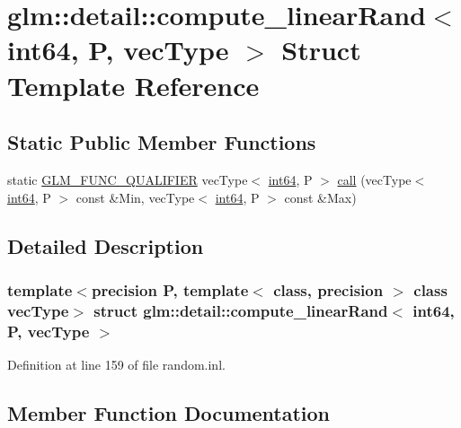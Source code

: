 \hypertarget{structglm_1_1detail_1_1compute__linear_rand_3_01int64_00_01_p_00_01vec_type_01_4}{}\section{glm\+::detail\+::compute\+\_\+linear\+Rand$<$ int64, P, vec\+Type $>$ Struct Template Reference}
\label{structglm_1_1detail_1_1compute__linear_rand_3_01int64_00_01_p_00_01vec_type_01_4}
\subsection*{Static Public Member Functions}
\begin{DoxyCompactItemize}
\item 
static \mbox{\hyperlink{setup_8hpp_a33fdea6f91c5f834105f7415e2a64407}{G\+L\+M\+\_\+\+F\+U\+N\+C\+\_\+\+Q\+U\+A\+L\+I\+F\+I\+ER}} vec\+Type$<$ \mbox{\hyperlink{namespaceglm_1_1detail_a5b1c3227ec636c24a0676746381adfc8}{int64}}, P $>$ \mbox{\hyperlink{structglm_1_1detail_1_1compute__linear_rand_3_01int64_00_01_p_00_01vec_type_01_4_ad6b4fdf74a9d37cfe638d062b82536ed}{call}} (vec\+Type$<$ \mbox{\hyperlink{namespaceglm_1_1detail_a5b1c3227ec636c24a0676746381adfc8}{int64}}, P $>$ const \&Min, vec\+Type$<$ \mbox{\hyperlink{namespaceglm_1_1detail_a5b1c3227ec636c24a0676746381adfc8}{int64}}, P $>$ const \&Max)
\end{DoxyCompactItemize}


\subsection{Detailed Description}
\subsubsection*{template$<$precision P, template$<$ class, precision $>$ class vec\+Type$>$\newline
struct glm\+::detail\+::compute\+\_\+linear\+Rand$<$ int64, P, vec\+Type $>$}



Definition at line 159 of file random.\+inl.



\subsection{Member Function Documentation}
\mbox{\label{structglm_1_1detail_1_1compute__linear_rand_3_01int64_00_01_p_00_01vec_type_01_4_ad6b4fdf74a9d37cfe638d062b82536ed}} 
